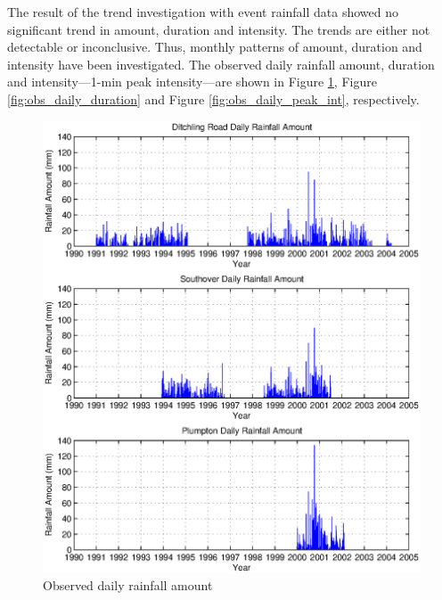 The result of the trend investigation with event rainfall data showed no
significant trend in amount, duration and intensity. The trends are either not
detectable or inconclusive. Thus, monthly patterns of amount, duration and
intensity have been investigated. The observed daily rainfall amount, duration
and intensity---1-min peak intensity---are shown in Figure
\ref{fig:obs_daily_amount}, Figure \ref{fig:obs_daily_duration} and Figure
\ref{fig:obs_daily_peak_int}, respectively.

\begin{figure}[htbp]
  \centering
    \includegraphics[width=1.0\textwidth]{./img/obs_daily_amount}
  \caption{Observed daily rainfall amount}
  \label{fig:obs_daily_amount}
\end{figure}

